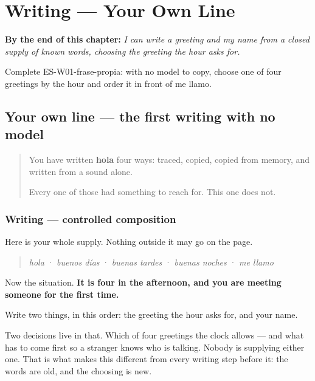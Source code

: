 
\chapter{Writing --- Your Own Line}
\label{ch:escribir-frase-propia}

\begin{chapteropening}
\textbf{By the end of this chapter:} \emph{I can write a greeting and my name from a closed supply of known words, choosing the greeting the hour asks for.}

Complete ES-W01-frase-propia: with no model to copy, choose one of four greetings by the hour and order it in front of me llamo.
\end{chapteropening}

\section[buenos días]{Your own line — the first writing with no model}

\label{lesson:ES-W01-frase-propia}



\begin{quote}
You have written \textbf{hola} four ways: traced, copied, copied from memory, and written from a sound alone.

Every one of those had something to reach for. This one does not.
\end{quote}

\subsection*{Writing — controlled composition}
Here is your whole supply. Nothing outside it may go on the page.

\begin{quote}
\emph{hola} · \emph{buenos días} · \emph{buenas tardes} · \emph{buenas noches} · \emph{me llamo}
\end{quote}

Now the situation. \textbf{It is four in the afternoon, and you are meeting someone for the first time.}

Write two things, in this order: the greeting the hour asks for, and your name.

Two decisions live in that. Which of four greetings the clock allows — and what has to come first so a stranger knows who is talking. Nobody is supplying either one. That is what makes this different from every writing step before it: the words are old, and the choosing is new.

